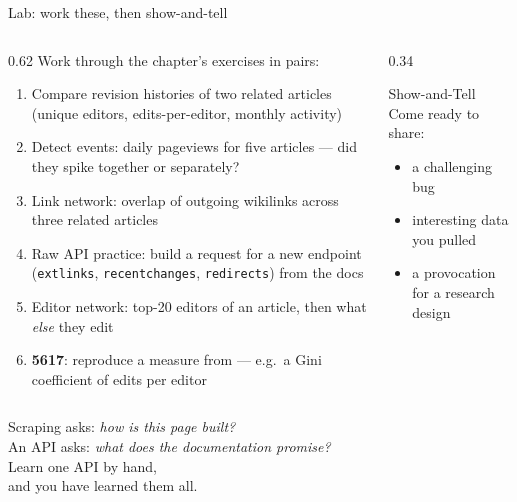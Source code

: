 \documentclass[9pt,aspectratio=169]{beamer}
\begin{document}
\begin{frame}{Lab: work these, then show-and-tell}
    \begin{columns}[T]
        \begin{column}{0.62\textwidth}
            Work through the chapter's exercises in pairs:
            \begin{enumerate}\small
                \item Compare revision histories of two related articles (unique editors, edits-per-editor, monthly activity)
                \item Detect events: daily pageviews for five articles --- did they spike together or separately?
                \item Link network: overlap of outgoing wikilinks across three related articles
                \item Raw API practice: build a request for a new endpoint (\texttt{extlinks}, \texttt{recentchanges}, \texttt{redirects}) from the docs
                \item Editor network: top-20 editors of an article, then what \textit{else} they edit
                \item[6.] \textcolor{tab-purple}{\textbf{5617}}: reproduce a measure from \textcite{mesgari2015sum} --- e.g.\ a Gini coefficient of edits per editor
            \end{enumerate}
        \end{column}
        \begin{column}{0.34\textwidth}
            \begin{block}{Show-and-Tell}
                \footnotesize Come ready to share:
                \begin{itemize}\footnotesize
                    \item a challenging bug
                    \item interesting data you pulled
                    \item a provocation for a research design
                \end{itemize}
            \end{block}
        \end{column}
    \end{columns}
\end{frame}

\begin{frame}[standout]
    Scraping asks: \textit{how is this page built?}\\
    An API asks: \textit{what does the documentation promise?}\\[1em]
    {\large Learn one API by hand,\\ and you have learned them all.}
\end{frame}
\end{document}
